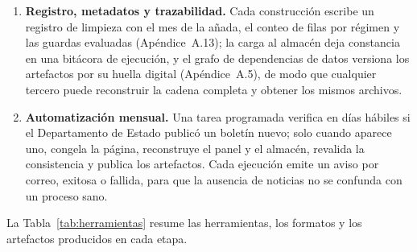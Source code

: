 \documentclass[12pt,letterpaper]{report}
\begin{document}
\begin{enumerate}[leftmargin=*]
DuckDB (Apéndice~A.7), cuyas restricciones de clave, de integridad referencial y de
verificación actúan como contrato de calidad.
\item \textbf{Registro, metadatos y trazabilidad.} Cada construcción escribe un registro de
limpieza con el mes de la añada, el conteo de filas por régimen y las guardas evaluadas
(Apéndice~A.13); la carga al almacén deja constancia en una bitácora de ejecución, y el
grafo de dependencias de datos versiona los artefactos por su huella digital
(Apéndice~A.5), de modo que cualquier tercero puede reconstruir la cadena completa y
obtener los mismos archivos.
\item \textbf{Automatización mensual.} Una tarea programada verifica en días hábiles si el
Departamento de Estado publicó un boletín nuevo; solo cuando aparece uno, congela la página,
reconstruye el panel y el almacén, revalida la consistencia y publica los artefactos. Cada
ejecución emite un aviso por correo, exitosa o fallida, para que la ausencia de noticias no
se confunda con un proceso sano.
\end{enumerate}

La Tabla~\ref{tab:herramientas} resume las herramientas, los formatos y los artefactos
producidos en cada etapa.
\end{document}
